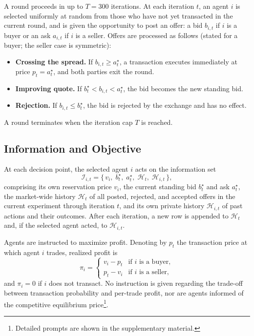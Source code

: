 \documentclass[letterpaper]{article} %
\begin{document}
A round proceeds in up to $T = 300$ iterations. At each iteration $t$, an agent $i$ is selected
uniformly at random from those who have not yet transacted in the current round,
and is given the opportunity to post an offer: a bid $b_{i,t}$ if $i$ is a buyer or an ask $a_{i,t}$
if $i$ is a seller. Offers are processed as follows (stated for a buyer; the seller case is symmetric):
\begin{itemize}
    \item \textbf{Crossing the spread.} If $b_{i,t} \geq a^\star_t$, a transaction executes immediately
        at price $p_t = a^\star_t$, and both parties exit the round.
    \item \textbf{Improving quote.} If $b^\star_t < b_{i,t} < a^\star_t$, the bid becomes the new
        standing bid.
    \item \textbf{Rejection.} If $b_{i,t} \leq b^\star_t$, the bid is rejected by the exchange
        and has no effect.
\end{itemize}
A round terminates when the iteration cap $T$ is reached.

\subsection{Information and Objective}
At each decision point, the selected agent $i$ acts on the information set
\begin{equation}
    \mathcal{I}_{i,t} = \bigl\{\, v_i,\; b^\star_t,\; a^\star_t,\; \mathcal{H}_t,\; \mathcal{H}_{i,t} \,\bigr\},
\end{equation}
comprising its own reservation price $v_i$, the current standing bid $b^\star_t$ and ask $a^\star_t$, the market-wide history $\mathcal{H}_t$ of all posted, rejected, and accepted offers in the current experiment through iteration $t$, and its own private history $\mathcal{H}_{i,t}$ of past actions and their outcomes. After each iteration, a new row is appended to $\mathcal{H}_t$ and, if the selected agent acted, to $\mathcal{H}_{i,t}$.

Agents are instructed to maximize profit. Denoting by $p_t$ the transaction price
at which agent $i$ trades, realized profit is
\begin{equation}
    \pi_i =
    \begin{cases}
        v_i - p_t & \text{if $i$ is a buyer}, \\
        p_t - v_i & \text{if $i$ is a seller},
    \end{cases}
\end{equation} 
and $\pi_i = 0$ if $i$ does not transact. No instruction is given
regarding the trade-off between transaction probability and per-trade profit, nor are agents informed of the competitive equilibrium price\footnote{Detailed prompts are shown in the supplementary material.}.
\end{document}
